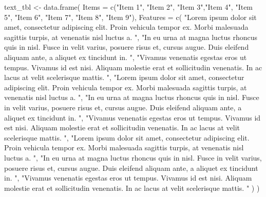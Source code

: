 \documentclass[12pt,a4paper,oneside,]{article}
\newenvironment{Shaded}{\begin{snugshade}}{\end{snugshade}}
\newcommand{\AttributeTok}[1]{\textcolor[rgb]{0.77,0.63,0.00}{#1}}
\newcommand{\FunctionTok}[1]{\textcolor[rgb]{0.00,0.00,0.00}{#1}}
\newcommand{\NormalTok}[1]{#1}
\newcommand{\OtherTok}[1]{\textcolor[rgb]{0.56,0.35,0.01}{#1}}
\newcommand{\StringTok}[1]{\textcolor[rgb]{0.31,0.60,0.02}{#1}}
\numberwithin{dummy}{section}
\theoremstyle{ocrenumbox}
\theoremstyle{blacknumex}
\theoremstyle{blacknumbox}
\theoremstyle{ocrenum}
\theoremstyle{ocrenum}
\begin{document}
\begin{Shaded}
\begin{Highlighting}[]
\NormalTok{text\_tbl }\OtherTok{\textless{}{-}} \FunctionTok{data.frame}\NormalTok{(}
  \AttributeTok{Items =} \FunctionTok{c}\NormalTok{(}\StringTok{"Item 1"}\NormalTok{, }\StringTok{"Item 2"}\NormalTok{, }\StringTok{"Item 3"}\NormalTok{,}\StringTok{"Item 4"}\NormalTok{, }\StringTok{"Item 5"}\NormalTok{, }\StringTok{"Item 6"}\NormalTok{, }
            \StringTok{"Item 7"}\NormalTok{, }\StringTok{"Item 8"}\NormalTok{, }\StringTok{"Item 9"}\NormalTok{), }
  \AttributeTok{Features =} \FunctionTok{c}\NormalTok{(}
    \StringTok{"Lorem ipsum dolor sit amet, consectetur adipiscing elit.}
\StringTok{    Proin vehicula tempor ex. Morbi malesuada sagittis turpis,}
\StringTok{    at venenatis nisl luctus a. "}\NormalTok{,}
    \StringTok{"In eu urna at magna luctus rhoncus quis in nisl. Fusce in velit}
\StringTok{    varius, posuere risus et, cursus augue. Duis eleifend aliquam ante,}
\StringTok{    a aliquet ex tincidunt in. "}\NormalTok{,}
    \StringTok{"Vivamus venenatis egestas eros ut tempus. Vivamus id est nisi.}
\StringTok{    Aliquam molestie erat et sollicitudin venenatis. In ac lacus at}
\StringTok{    velit scelerisque mattis. "}\NormalTok{,}
    \StringTok{"Lorem ipsum dolor sit amet, consectetur adipiscing elit.}
\StringTok{    Proin vehicula tempor ex. Morbi malesuada sagittis turpis,}
\StringTok{    at venenatis nisl luctus a. "}\NormalTok{,}
    \StringTok{"In eu urna at magna luctus rhoncus quis in nisl. Fusce in velit}
\StringTok{    varius, posuere risus et, cursus augue. Duis eleifend aliquam ante,}
\StringTok{    a aliquet ex tincidunt in. "}\NormalTok{,}
    \StringTok{"Vivamus venenatis egestas eros ut tempus. Vivamus id est nisi.}
\StringTok{    Aliquam molestie erat et sollicitudin venenatis. In ac lacus at}
\StringTok{    velit scelerisque mattis. "}\NormalTok{,}
    \StringTok{"Lorem ipsum dolor sit amet, consectetur adipiscing elit.}
\StringTok{    Proin vehicula tempor ex. Morbi malesuada sagittis turpis,}
\StringTok{    at venenatis nisl luctus a. "}\NormalTok{,}
    \StringTok{"In eu urna at magna luctus rhoncus quis in nisl. Fusce in velit}
\StringTok{    varius, posuere risus et, cursus augue. Duis eleifend aliquam ante,}
\StringTok{    a aliquet ex tincidunt in. "}\NormalTok{,}
    \StringTok{"Vivamus venenatis egestas eros ut tempus. Vivamus id est nisi.}
\StringTok{    Aliquam molestie erat et sollicitudin venenatis. In ac lacus at}
\StringTok{    velit scelerisque mattis. "}
\NormalTok{    ) }
\NormalTok{  )}

\end{Highlighting}
\end{Shaded}
\end{document}
